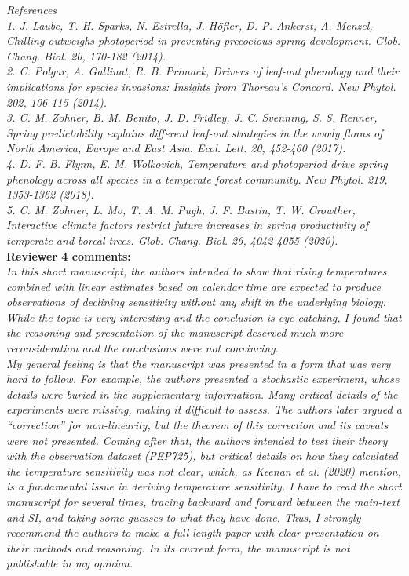 \documentclass[11pt,letter]{article}
\begin{document}
\emph{References}\\
\emph{1. 	J. Laube, T. H. Sparks, N. Estrella, J. Höfler, D. P. Ankerst, A. Menzel, Chilling outweighs photoperiod in preventing precocious spring development. Glob. Chang. Biol. 20, 170-182 (2014).}\\
\emph{2. 	C. Polgar, A. Gallinat, R. B. Primack, Drivers of leaf-out phenology and their implications for species invasions: Insights from Thoreau's Concord. New Phytol. 202, 106-115 (2014).}\\
\emph{3. 	C. M. Zohner, B. M. Benito, J. D. Fridley, J. C. Svenning, S. S. Renner, Spring predictability explains different leaf-out strategies in the woody floras of North America, Europe and East Asia. Ecol. Lett. 20, 452-460 (2017).}\\
\emph{4. 	D. F. B. Flynn, E. M. Wolkovich, Temperature and photoperiod drive spring phenology across all species in a temperate forest community. New Phytol. 219, 1353-1362 (2018).}\\
\emph{5. 	C. M. Zohner, L. Mo, T. A. M. Pugh, J. F. Bastin, T. W. Crowther, Interactive climate factors restrict future increases in spring productivity of temperate and boreal trees. Glob. Chang. Biol. 26, 4042-4055 (2020).}\\


{\bf Reviewer 4 comments:} \\

\emph{In this short manuscript, the authors intended to show that rising temperatures combined with linear estimates based on calendar time are expected to produce observations of declining sensitivity without any shift in the underlying biology. While the topic is very interesting and the conclusion is eye-catching, I found that the reasoning and presentation of the manuscript deserved much more reconsideration and the conclusions were not convincing.}\\

\emph{My general feeling is that the manuscript was presented in a form that was very hard to follow. For example, the authors presented a stochastic experiment, whose details were buried in the supplementary information. Many critical details of the experiments were missing, making it difficult to assess. The authors later argued a ``correction'' for non-linearity, but the theorem of this correction and its caveats were not presented. Coming after that, the authors intended to test their theory with the observation dataset (PEP725), but critical details on how they calculated the temperature sensitivity was not clear, which, as Keenan et al. (2020) mention, is a fundamental issue in deriving temperature sensitivity. I have to read the short manuscript for several times, tracing backward and forward between the main-text and SI, and taking some guesses to what they have done. Thus, I strongly recommend the authors to make a full-length paper with clear presentation on their methods
and reasoning. In its current form, the manuscript is not publishable in my opinion.}\\
\end{document}
